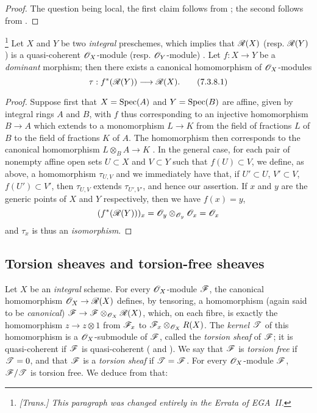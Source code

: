 \begin{proof}
\label{proof-1.7.3.7}
The question being local, the first claim follows from ; the second follows from .
\end{proof}

\begin{env}[7.3.8]
\label{I.7.3.8}
\footnote{\emph{[Trans.] This paragraph was changed entirely in the Errata of EGA~II.}}
Let $X$ and $Y$ be two \emph{integral} preschemes, which implies that $\mathscr{R}(X)$ (resp. $\mathscr{R}(Y)$) is a quasi-coherent $\mathscr{O}_X$-module (resp. $\mathscr{O}_Y$-module) .
Let $f:X\to Y$ be a \emph{dominant} morphism; then there exists a canonical homomorphism of $\mathscr{O}_X$-modules
\[
\label{I.7.3.8.1}
  \tau:f^*(\sh{R}(Y))\to\sh{R}(X).
  \tag{7.3.8.1}
\]
\end{env}

\begin{proof}
\label{proof-1.7.3.8}
Suppose first that $X=\operatorname{Spec}(A)$ and $Y=\operatorname{Spec}(B)$ are affine, given by integral rings $A$ and $B$, with $f$ thus corresponding to an injective homomorphism $B\to A$ which extends to a monomorphism $L\to K$ from the field of fractions $L$ of $B$ to the field of fractions $K$ of $A$.
The homomorphism  then corresponds to the canonical homomorphism $L\otimes_B A\to K$ .
In the general case, for each pair of nonempty affine open sets $U\subset X$ and $V\subset Y$ such that $f(U)\subset V$, we define, as above, a homomorphism $\tau_{U,V}$ and we immediately have that, if $U'\subset U$, $V'\subset V$, $f(U')\subset V'$, then $\tau_{U,V}$ extends $\tau_{U',V'}$, and hence our assertion.
If $x$ and $y$ are the generic points of $X$ and $Y$ respectively, then we have $f(x)=y$,
\[
  (f^*(\mathscr{R}(Y)))_x=\mathscr{O}_y\otimes_{\mathscr{O}_y}\mathscr{O}_x=\mathscr{O}_x
\]
 and $\tau_x$ is thus an \emph{isomorphism}.
\end{proof}

\subsection{Torsion sheaves and torsion-free sheaves}
\label{subsection:I.7.4}

\begin{env}[7.4.1]
\label{I.7.4.1}
Let $X$ be an \emph{integral} scheme.
For every $\mathscr{O}_X$-module $\mathscr{F}$, the canonical homomorphism $\sh{O}_X\to\sh{R}(X)$ defines, by tensoring, a homomorphism (again said to be \emph{canonical}) $\sh{F}\to\sh{F}\otimes_{\sh{O}_X}\sh{R}(X)$, which, on each fibre, is exactly the homomorphism $z\to z\otimes1$ from $\mathscr{F}_x$ to $\mathscr{F}_x\otimes_{\mathscr{O}_X}R(X)$.
The \emph{kernel $\mathscr{T}$} of this homomorphism is a $\mathscr{O}_X$-submodule of $\mathscr{F}$, called the \emph{torsion sheaf} of $\mathscr{F}$; it is quasi-coherent if $\mathscr{F}$ is quasi-coherent ( and ).
We say that $\mathscr{F}$ is \emph{torsion free} if $\mathscr{T}=0$, and that $\mathscr{F}$ is a \emph{torsion sheaf} if $\mathscr{T}=\mathscr{F}$.
For every $\mathscr{O}_X$-module $\mathscr{F}$, $\mathscr{F}/\mathscr{T}$ is torsion free.
We deduce from  that:
\end{env}

